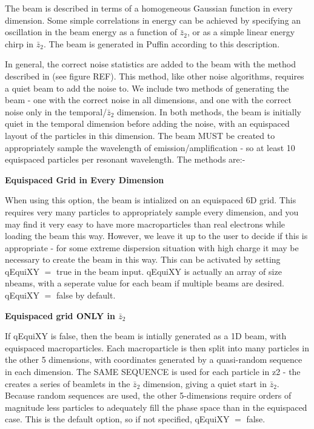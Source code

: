 \documentclass[12pt]{article}%
\begin{document}
The beam is described in terms of a homogeneous Gaussian function in every dimension. Some simple correlations in energy can be achieved by specifying an oscillation in the beam energy as a function of $\bar{z}_2$, or as a simple linear energy chirp in $\bar{z}_2$. The beam is generated in Puffin according to this description.

In general, the correct noise statistics are added to the beam with the method described in \cite{noise1} (see figure REF). This method, like other noise algorithms, requires a quiet beam to add the noise to. We include two methods of generating the beam - one with the correct noise in all dimensions, and one with the correct noise only in the temporal/$\bar{z}_2$ dimension. In both methods, the beam is initially quiet in the temporal dimension before adding the noise, with an equispaced layout of the particles in this dimension. The beam MUST be created to appropriately sample the wavelength of emission/amplification - so at least 10 equispaced particles per resonant wavelength. The methods are:-




{\bf Equispaced Grid in Every Dimension}

When using this option, the beam is intialized on an equispaced 6D grid. This requires very many particles to appropriately sample every dimension, and you may find it very easy to have more macroparticles than real electrons while loading the beam this way. However, we leave it up to the user to decide if this is appropriate - for some extreme dispersion situation with high charge it may be necessary to create the beam in this way.  This can be activated by setting qEquiXY $=$ true in the beam input. qEquiXY is actually an array of size nbeams, with a seperate value for each beam if multiple beams are desired. qEquiXY $=$ false by default.

{\bf Equispaced grid ONLY in $\bar{z}_2$}

If qEquiXY is false, then the beam is intially generated as a 1D beam, with equispaced macroparticles. Each macroparticle is then split into many particles in the other 5 dimensions, with coordinates generated by a quasi-random sequence in each dimension. The SAME SEQUENCE is used for each particle in z2 - the creates a series of beamlets in the $\bar{z}_2$ dimension, giving a quiet start in $\bar{z}_2$. Because random sequences are used, the other 5-dimensions require orders of magnitude less particles to adequately fill the phase space than in the equispaced case. This is the default option, so if not specified, qEquiXY $=$ false. 
\end{document}
